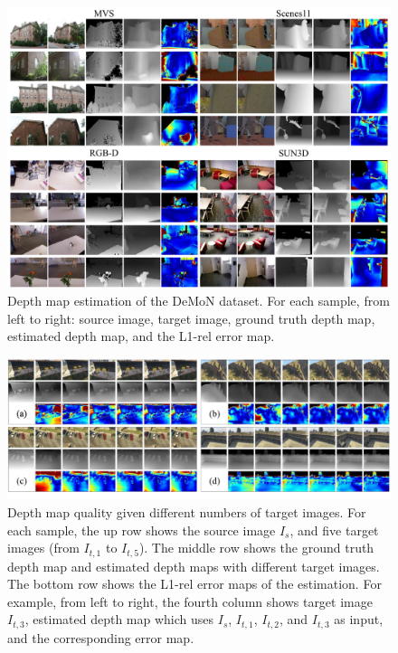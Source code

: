 \documentclass[letterpaper, 10 pt, conference]{ieeeconf}  %
\begin{document}
\begin{figure}[h]
\vspace{-2.5cm}
\begin{center}
\includegraphics[width=1.0\linewidth]{figs/sup_demon.pdf}
\end{center}
\caption{Depth map estimation of the DeMoN dataset. For each sample, from left to right: source image, target image, ground truth depth map, estimated depth map, and the L1-rel error map.}
   
\label{fig:sup_demon}
\end{figure}
\begin{figure}[h]
\begin{center}
\includegraphics[width=1.0\linewidth]{figs/gta_multiview2.pdf}
\end{center}
\vspace{-0.5cm}
\caption{Depth map quality given different numbers of target images. For each sample, the up row shows the source image $I_s$, and five target images (from $I_{t,1}$ to $I_{t,5}$). The middle row shows the ground truth depth map and estimated depth maps with different target images. The bottom row shows the L1-rel error maps of the estimation. For example, from left to right, the fourth column shows target image $I_{t,3}$, estimated depth map which uses $I_s$, $I_{t,1}$, $I_{t,2}$, and $I_{t,3}$ as input, and the corresponding error map.}
\label{fig:gta_multiview}
\end{figure}
\end{document}
